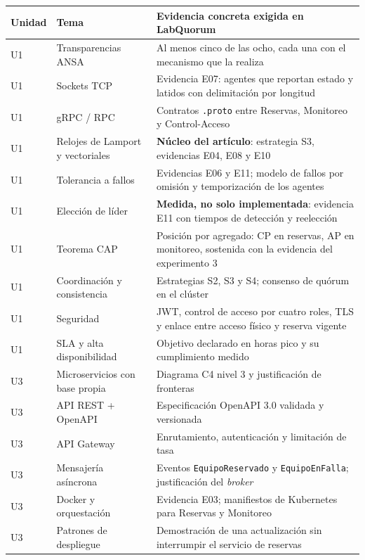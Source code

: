 \documentclass[11pt,a4paper]{article}
\begin{document}
\begin{center}
	\footnotesize
	\begin{longtable}{@{}p{1.2cm}p{5.2cm}p{8.4cm}@{}}
		\toprule
		\textbf{Unidad} & \textbf{Tema} & \textbf{Evidencia concreta exigida en LabQuorum} \\
		\midrule
		\endhead
		U1 & Transparencias ANSA & Al menos cinco de las ocho, cada una con el mecanismo que la realiza \\
		U1 & Sockets TCP & Evidencia E07: agentes que reportan estado y latidos con delimitación por longitud \\
		U1 & gRPC / RPC & Contratos \texttt{.proto} entre Reservas, Monitoreo y Control-Acceso \\
		U1 & Relojes de Lamport y vectoriales & \textbf{Núcleo del artículo}: estrategia S3, evidencias E04, E08 y E10 \cite{lamport1978time} \\
		U1 & Tolerancia a fallos & Evidencias E06 y E11; modelo de fallos por omisión y temporización de los agentes \\
		U1 & Elección de líder & \textbf{Medida, no solo implementada}: evidencia E11 con tiempos de detección y reelección \\
		U1 & Teorema CAP & Posición por agregado: CP en reservas, AP en monitoreo, sostenida con la evidencia del experimento 3 \cite{gilbert2002brewer} \\
		U1 & Coordinación y consistencia & Estrategias S2, S3 y S4; consenso de quórum en el clúster \cite{gray2006consensus} \\
		U1 & Seguridad & JWT, control de acceso por cuatro roles, TLS y enlace entre acceso físico y reserva vigente \\
		U1 & SLA y alta disponibilidad & Objetivo declarado en horas pico y su cumplimiento medido \\
		\addlinespace
		U3 & Microservicios con base propia & Diagrama C4 nivel 3 y justificación de fronteras \\
		U3 & API REST + OpenAPI & Especificación OpenAPI 3.0 validada y versionada \\
		U3 & API Gateway & Enrutamiento, autenticación y limitación de tasa \\
		U3 & Mensajería asíncrona & Eventos \texttt{EquipoReservado} y \texttt{EquipoEnFalla}; justificación del \emph{broker} \\
		U3 & Docker y orquestación & Evidencia E03; manifiestos de Kubernetes para Reservas y Monitoreo \cite{deslauriers2025deployment} \\
		U3 & Patrones de despliegue & Demostración de una actualización sin interrumpir el servicio de reservas \\

\end{longtable}
\end{center}
\end{document}
